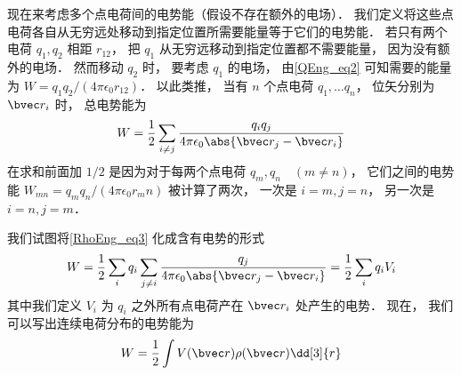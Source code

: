 

现在来考虑多个点电荷间的电势能（假设不存在额外的电场）． 我们定义将这些点电荷各自从无穷远处移动到指定位置所需要能量等于它们的电势能． 若只有两个电荷 $q_1, q_2$ 相距 $r_12$， 把 $q_1$ 从无穷远移动到指定位置都不需要能量， 因为没有额外的电场． 然而移动 $q_2$ 时， 要考虑 $q_1$ 的电场， 由\autoref{QEng_eq2} 可知需要的能量为 $W = q_1q_2/(4\pi\epsilon_0 r_12)$． 以此类推， 当有 $n$ 个点电荷 $q_1, \dots q_n$， 位矢分别为 $\bvec r_i$ 时， 总电势能为
\begin{equation}\label{RhoEng_eq3}
W = \frac12\sum_{i \neq j} \frac{q_i q_j}{4\pi\epsilon_0 \abs{\bvec r_j - \bvec r_i}}
\end{equation}
在求和前面加 $1/2$ 是因为对于每两个点电荷 $q_m, q_n\quad (m \neq n)$， 它们之间的电势能 $W_{mn} = q_m q_n/(4\pi\epsilon_0 r_mn)$ 被计算了两次， 一次是 $i = m, j = n$， 另一次是 $i = n, j = m$．

我们试图将\autoref{RhoEng_eq3} 化成含有电势的形式
\begin{equation}
W = \frac12 \sum_i q_i \sum_{j\neq i} \frac{q_j}{4\pi\epsilon_0\abs{\bvec r_j - \bvec r_i}}
=\frac12 \sum_i q_i V_i
\end{equation}
其中我们定义 $V_i$ 为 $q_i$ 之外所有点电荷产在 $\bvec r_i$ 处产生的电势． 现在， 我们可以写出连续电荷分布的电势能为
\begin{equation}
W = \frac 12 \int V(\bvec r) \rho(\bvec r) \dd[3]{r}
\end{equation}
